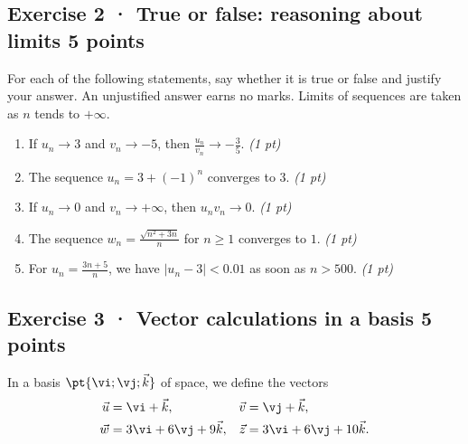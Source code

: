 \subsection*{Exercise 2 · True or false: reasoning about limits \hfill 5 points}For each of the following statements, say whether it is true or false and justify your answer. An unjustified answer earns no marks. Limits of sequences are taken as $n$ tends to $+\infty$.

\begin{enumerate}

\item If $u_n\to 3$ and $v_n\to-5$, then $\frac{u_n}{v_n}\to-\frac{3}{5}$. \hfill\textit{(1 pt)}

\item The sequence $u_n=3+(-1)^n$ converges to $3$. \hfill\textit{(1 pt)}

\item If $u_n\to0$ and $v_n\to+\infty$, then $u_nv_n\to0$. \hfill\textit{(1 pt)}

\item The sequence $w_n=\frac{\sqrt{n^2+3n}}{n}$ for $n\ge1$ converges to $1$. \hfill\textit{(1 pt)}

\item For $u_n=\frac{3n+5}{n}$, we have $|u_n-3|<\num{0,01}$ as soon as $n> 500$. \hfill\textit{(1 pt)}

\end{enumerate}

\mxnewpage{}

\subsection*{Exercise 3 · Vector calculations in a basis \hfill 5 points}In a basis $\pt{\vi;\vj;\vec k}$ of space, we define the vectors
\[\begin{aligned}\vec u&=\vi+\vec k,&\vec v&=\vj+\vec k,\\
\vec w&=3\vi+6\vj+9\vec k,&\vec z&=3\vi+6\vj+10\vec k.\end{aligned}\]

